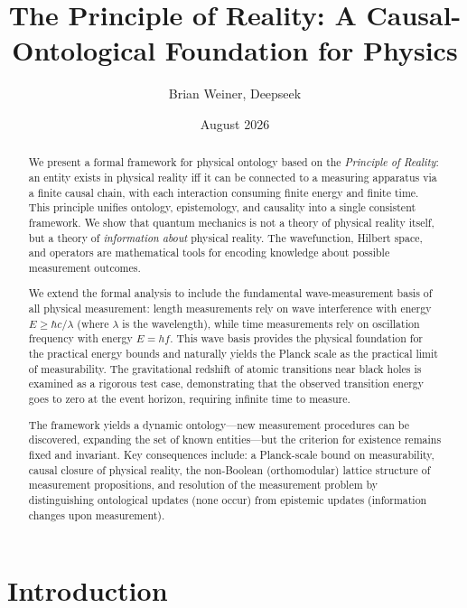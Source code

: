\documentclass[aps,preprint,showpacs,showkeys]{revtex4}
\begin{document}
\title{The Principle of Reality: A Causal-Ontological Foundation for Physics}
\author{Brian Weiner, Deepseek}
\date{August 2026}

\begin{abstract}
We present a formal framework for physical ontology based on the \textit{%
Principle of Reality}: an entity exists in physical reality iff it can be
connected to a measuring apparatus via a finite causal chain, with each
interaction consuming finite energy and finite time. This principle unifies
ontology, epistemology, and causality into a single consistent framework. We
show that quantum mechanics is not a theory of physical reality itself, but
a theory of \textit{information about} physical reality. The wavefunction,
Hilbert space, and operators are mathematical tools for encoding knowledge
about possible measurement outcomes.

We extend the formal analysis to include the fundamental wave-measurement
basis of all physical measurement: length measurements rely on wave
interference with energy $E \ge \hbar c/\lambda$ (where $\lambda$ is the
wavelength), while time measurements rely on oscillation frequency with
energy $E = hf$. This wave basis provides the physical foundation for the
practical energy bounds and naturally yields the Planck scale as the
practical limit of measurability. The gravitational redshift of atomic
transitions near black holes is examined as a rigorous test case,
demonstrating that the observed transition energy goes to zero at the event
horizon, requiring infinite time to measure.

The framework yields a dynamic ontology---new measurement procedures can be
discovered, expanding the set of known entities---but the criterion for
existence remains fixed and invariant. Key consequences include: a
Planck-scale bound on measurability, causal closure of physical reality, the
non-Boolean (orthomodular) lattice structure of measurement propositions,
and resolution of the measurement problem by distinguishing ontological
updates (none occur) from epistemic updates (information changes upon
measurement).
\end{abstract}

\maketitle
{}

\section{Introduction}
\end{document}
